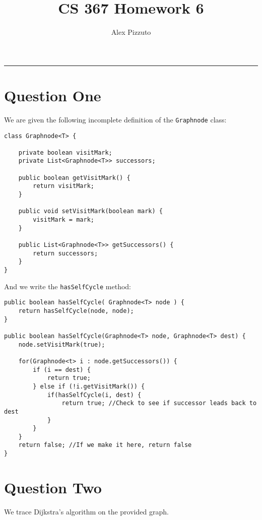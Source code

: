\documentclass[11pt,letterpaper]{article}
\author{Alex Pizzuto}
\title{CS 367 Homework 6}
\begin{document}
\date{}
\maketitle
\hrule

\section{Question One}
We are given the following incomplete definition of the \texttt{Graphnode} class:
\begin{lstlisting}
class Graphnode<T> {
 
    private boolean visitMark;
    private List<Graphnode<T>> successors;
 
    public boolean getVisitMark() {
        return visitMark;
    }
 
    public void setVisitMark(boolean mark) {
        visitMark = mark;
    }
 
    public List<Graphnode<T>> getSuccessors() {
        return successors;
    }
}
\end{lstlisting}
And we write the \texttt{hasSelfCycle} method:
\begin{lstlisting}
public boolean hasSelfCycle( Graphnode<T> node ) {
	return hasSelfCycle(node, node);
}

public boolean hasSelfCycle(Graphnode<T> node, Graphnode<T> dest) {
	node.setVisitMark(true);
	
	for(Graphnode<t> i : node.getSuccessors()) {
		if (i == dest) {
			return true;
		} else if (!i.getVisitMark()) {
			if(hasSelfCycle(i, dest) {
				return true; //Check to see if successor leads back to dest
			}
		}
	}
	return false; //If we make it here, return false
}
\end{lstlisting}

\section{Question Two}

We trace Dijkstra's algorithm on the provided graph. 
\end{document}
